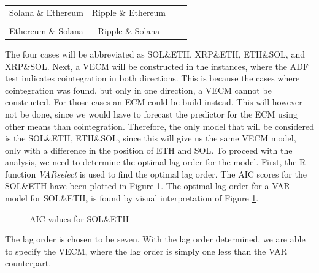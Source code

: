 \pause
\begin{center}
\begin{tabular}{cccc}
   Solana \& Ethereum \quad & \quad Ripple \& Ethereum\\\\
   Ethereum \& Solana \quad & \quad Ripple \& Solana
\end{tabular}
\end{center}
\pause
\noindent The four cases will be abbreviated as SOL\&ETH, XRP\&ETH, ETH\&SOL, and XRP\&SOL. Next, a VECM will be constructed in the instances, where the ADF test indicates cointegration in both directions. This is because the cases where cointegration was found, but only in one direction, a VECM cannot be constructed. For those cases an ECM could be build instead. This will however not be done, since we would have to forecast the predictor for the ECM using other means than cointegration. Therefore, the only model that will be considered is the SOL\&ETH, ETH\&SOL, since this will give us the same VECM model, only with a difference in the position of ETH and SOL. To proceed with the analysis, we need to determine the optimal lag order for the model. First, the R function \textit{VARselect} is used to find the optimal lag order. The AIC scores for the SOL\&ETH have been plotted in Figure \ref{fig:AIC_plots}. The optimal lag order for a VAR model for SOL\&ETH, is found by visual interpretation of Figure \ref{fig:AIC_plots}.
\begin{figure}[H]
  \centering
  \quad
  
  \caption{AIC values for SOL\&ETH}
  \label{fig:AIC_plots}
\end{figure}
\noindent The lag order is chosen to be seven. With the lag order determined, we are able to specify the VECM, where the lag order is simply one less than the VAR counterpart.

